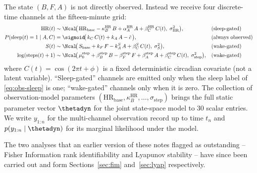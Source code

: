 The state $(B,F,A)$ is not directly observed. Instead we receive four
discrete-time channels at the fifteen-minute grid:
\begin{align}
  \mathrm{HR}(t) &\sim
    \Ncal\!\bigl(\,\mathrm{HR}_{\mathrm{base}}
                  - \kappa_B^{\mathrm{HR}}\,B
                  + \alpha_A^{\mathrm{HR}}\,A
                  + \beta_C^{\mathrm{HR}}\,C(t),\;
                  \sigma_{\mathrm{HR}}^2\bigr),
    && \text{(sleep-gated)} \label{eq:obs-hr}\\
  P(\mathrm{sleep}(t)=1\mid A,C) &=
    \sigmoid\!\bigl(\,k_C\,C(t) + k_A\,A - \tilde c\,\bigr),
    && \text{(always observed)} \label{eq:obs-sleep}\\
  S(t) &\sim
    \Ncal\!\bigl(\,S_{\mathrm{base}} + k_F\,F - k_A^S\,A
                  + \beta_C^S\,C(t),\;
                  \sigma_S^2\bigr),
    && \text{(wake-gated)} \label{eq:obs-stress}\\
  \log(\mathrm{steps}(t)+1) &\sim
    \Ncal\!\bigl(\,\mu_0^{\mathrm{step}} + \beta_B^{\mathrm{step}}\,B
                  - \beta_F^{\mathrm{step}}\,F + \beta_A^{\mathrm{step}}\,A
                  + \beta_C^{\mathrm{step}}\,C(t),\;
                  \sigma_{\mathrm{step}}^2\bigr),
    && \text{(wake-gated)} \label{eq:obs-steps}
\end{align}
where $C(t) = \cos(2\pi t + \phi)$ is a fixed deterministic circadian
covariate (not a latent variable). ``Sleep-gated'' channels are emitted
only when the sleep label of \eqref{eq:obs-sleep} is one; ``wake-gated''
channels only when it is zero. The collection of observation-model
parameters $(\mathrm{HR}_{\mathrm{base}},\kappa_B^{\mathrm{HR}},\dots,\sigma_{\mathrm{step}})$
brings the full static parameter vector $\thetadyn$ for the joint
state-space model to $30$ scalar entries. We write $y_{1:n}$ for the
multi-channel observation record up to time $t_n$ and
$p(y_{1:n}\mid \thetadyn)$ for its marginal likelihood under the model.

\medskip
\noindent
The two analyses that an earlier version of these notes flagged as
outstanding -- Fisher Information rank identifiability and Lyapunov
stability -- have since been carried out and form
Sections~\ref{sec:fim} and~\ref{sec:lyap} respectively.

